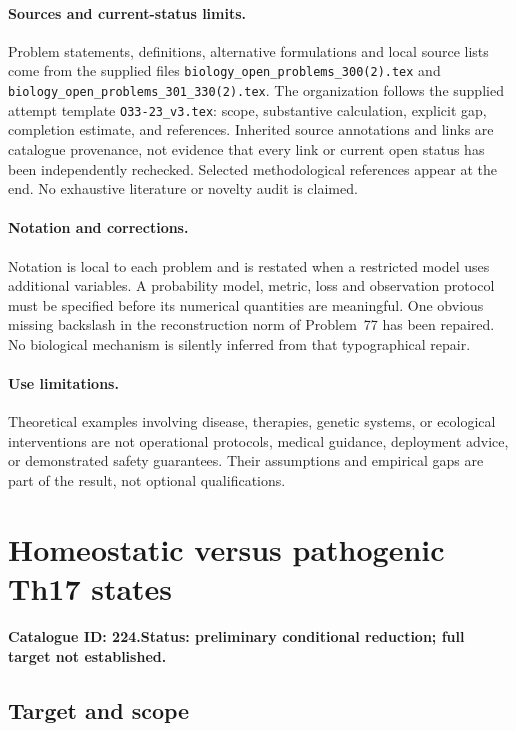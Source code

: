 \documentclass[11pt]{article}
\begin{document}
\paragraph{Sources and current-status limits.}
Problem statements, definitions, alternative formulations and local source lists
come from the supplied files
\texttt{biology\_open\_problems\_300(2).tex} and
\texttt{biology\_open\_problems\_301\_330(2).tex}.
The organization follows the supplied attempt template
\texttt{O33-23\_v3.tex}: scope, substantive calculation, explicit gap,
completion estimate, and references. Inherited source annotations and links are
catalogue provenance, not evidence that every link or current open status has
been independently rechecked. Selected methodological references appear at the
end. No exhaustive literature or novelty audit is claimed.

\paragraph{Notation and corrections.}
Notation is local to each problem and is restated when a restricted model uses
additional variables. A probability model, metric, loss and observation protocol
must be specified before its numerical quantities are meaningful. One obvious
missing backslash in the reconstruction norm of Problem~77 has been repaired.
No biological mechanism is silently inferred from that typographical repair.

\paragraph{Use limitations.}
Theoretical examples involving disease, therapies, genetic systems, or ecological
interventions are not operational protocols, medical guidance, deployment advice,
or demonstrated safety guarantees. Their assumptions and empirical gaps are part
of the result, not optional qualifications.

\setcounter{section}{223}
\section{Homeostatic versus pathogenic Th17 states}
\label{prob:224}
\noindent\textbf{Catalogue ID: 224.}\quad \textbf{Status: preliminary conditional reduction; full target not established.}
\subsection{Target and scope}
\end{document}
